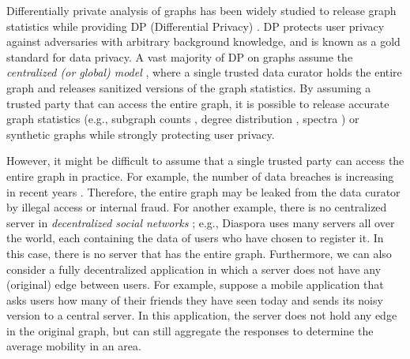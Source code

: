 Differentially private analysis of graphs \cite{Raskhodnikova_Encyclopedia16} has been widely studied to release graph statistics while providing DP (Differential Privacy) \cite{DP,Dwork_ICALP06}. 
DP protects user privacy against adversaries with arbitrary background knowledge, and is known as a gold standard for data privacy. 
A vast majority of DP on graphs assume the \textit{centralized (or global) model} \cite{blocki2012johnson,Chen_PoPETs20,Day_SIGMOD16,Hay_ICDM09,Karwa_PVLDB11,Kasiviswanathan_TCC13,Nissim_STOC07,Raskhodnikova_arXiv15,Raskhodnikova_Encyclopedia16,Song_arXiv18,Wang_PAKDD13,Wang_TDP13}, where a single trusted data curator holds the entire graph and releases sanitized versions of the graph statistics. 
By assuming a trusted party that can access the entire graph, 
it is possible to release accurate graph statistics 
(e.g., subgraph counts \cite{Karwa_PVLDB11,Kasiviswanathan_TCC13,Song_arXiv18}, degree distribution \cite{Day_SIGMOD16,Hay_ICDM09,Raskhodnikova_arXiv15}, 
spectra 
\cite{Wang_PAKDD13}) 
or synthetic graphs \cite{Chen_PoPETs20,Wang_TDP13} 
while strongly protecting user privacy. 

However, 
it might be difficult to assume that a single trusted party can access the entire graph in practice. 
For example, the number of data breaches is increasing in recent years \cite{data_breach1,data_breach2}. 
Therefore, 
the entire graph may be leaked from the data curator by illegal access or internal fraud. 
For another example, there is no centralized server in \textit{decentralized social networks} \cite{Paul_CN14,Salve_CSR18}; e.g., Diaspora \cite{Diaspora} uses many servers all over the world, each containing the data of users who have chosen to register it. 
In this case, there is no server that has the entire graph. 
Furthermore, we can also consider a fully decentralized application in which a server does not have any (original) edge between users. 
For example, suppose a mobile application that asks users how many of their friends they have seen today and sends its noisy version to a central server. 
In this application, the server does not hold any edge in the original graph, 
but can still aggregate the responses to determine the average mobility in an area. 

